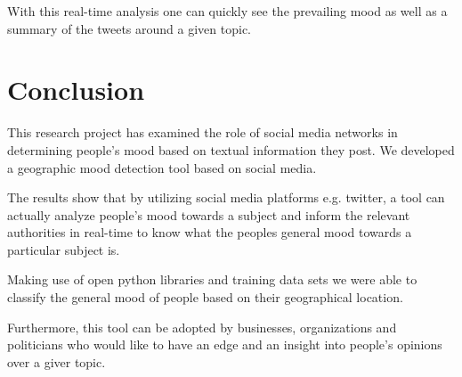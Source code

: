 With this real-time analysis one can quickly see the prevailing mood as well as a summary of the tweets around a given topic.





\chapter{Conclusion}
This research project has examined the role of social media networks in determining people's mood based on textual information they post. We developed a geographic mood detection tool based on social media.

The results show that by utilizing social media platforms e.g. twitter, a tool can actually analyze people's mood towards a subject and inform the relevant authorities in real-time to know what the people\textquotesingle s general mood towards a particular subject is.

Making use of open python libraries and training data sets we were able to classify the general mood 
of people based on their geographical location.

Furthermore, this tool can be adopted by businesses, organizations and politicians who would like to have an edge and an insight into people's opinions over a giver topic.


















